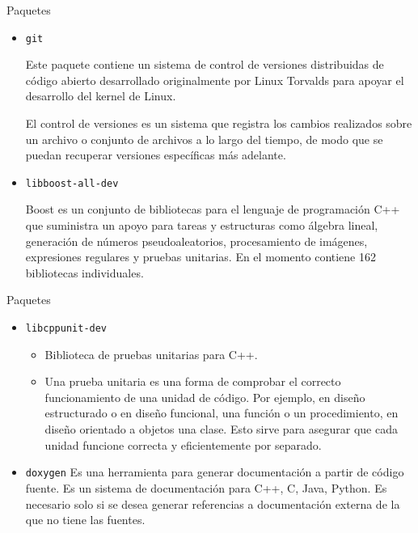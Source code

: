 \begin{frame}{Paquetes}
  \begin{itemize}
  \item {\tt git}

    Este paquete contiene un sistema de control de versiones
distribuidas de código abierto desarrollado originalmente por Linux Torvalds
para apoyar el desarrollo del kernel de Linux.
    
	El control de versiones es un sistema que registra los cambios
realizados sobre un archivo o conjunto de archivos a lo largo del tiempo, de
modo que se puedan recuperar versiones específicas más adelante.
  
	\item {\tt libboost-all-dev} 
  
	Boost es un conjunto de bibliotecas para el lenguaje de programación
C++ que suministra un apoyo para tareas y estructuras como álgebra lineal,
generación de números pseudoaleatorios, procesamiento de imágenes, expresiones
regulares y pruebas unitarias. En el momento contiene 162 bibliotecas
individuales.
  
	\end{itemize}
\end{frame}


\begin{frame}{Paquetes}
  \begin{itemize}
  \item {\tt libcppunit-dev}
  \begin{itemize}
    \item
    {Biblioteca de pruebas unitarias para C++.}
    \item
    {Una prueba unitaria es una forma de comprobar el correcto
funcionamiento de una unidad de código. Por ejemplo, en diseño
estructurado o en diseño funcional, una función o un procedimiento,
en diseño orientado a objetos una clase. Esto sirve para asegurar que
cada unidad funcione correcta y eficientemente por separado.}
    \end{itemize}
  \item {\tt doxygen}
  {Es una herramienta para generar documentación a partir de código fuente. Es un sistema de documentación para C++, C, Java, Python. Es necesario solo si se desea generar referencias a documentación externa de la que no tiene las fuentes.}
  \end{itemize}
\end{frame}

